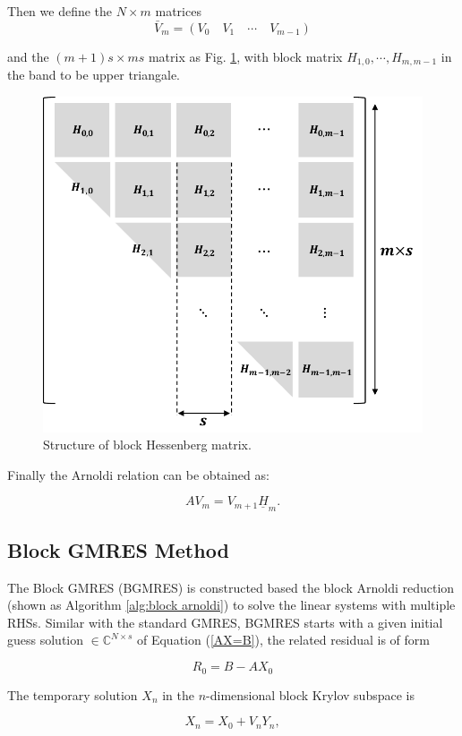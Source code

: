 Then we define the $N\times m$ matrices
\[\bar{V}_m = (V_0 \quad V_1  \quad \cdots  \quad V_{m-1})\]

and the $(m+1)s \times ms$ matrix as Fig. \ref{fig:block-hessemberg}, with block matrix $H_{1,0}, \cdots, H_{m,m-1}$ in the band to be upper triangale. 

\begin{figure}[htbp]
	\centering
	\includegraphics[width=0.6\linewidth]{fig/block-hessemberg.pdf}
	\caption{Structure of block Hessenberg matrix.}
	\label{fig:block-hessemberg}
\end{figure}

Finally the Arnoldi relation can be obtained as:

\begin{equation}
\label{blockarnoldi}
	AV_m= V_{m+1} \underline{H}_m.
\end{equation}

\subsection{Block GMRES Method}

The Block GMRES (BGMRES) is constructed based the block Arnoldi reduction (shown as Algorithm \ref{alg:block arnoldi}) to solve the linear systems with multiple RHSs. Similar with the standard GMRES, BGMRES starts with a given initial guess solution $\in \mathbb{C}^{N\times s}$ of Equation (\ref{AX=B}), the related residual is of form

\begin{equation}
	R_0=B-AX_0
\end{equation}

The temporary solution $X_n$ in the $n$-dimensional block Krylov subspace is

\begin{equation}
	X_n = X_0+V_nY_n,
\end{equation}

